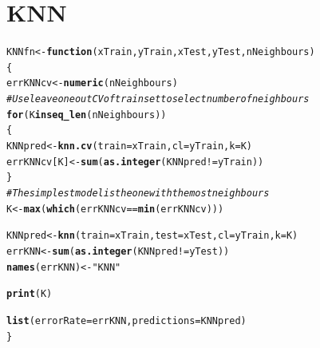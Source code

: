 \documentclass[a4paper,draft=false]{scrreprt}\usepackage[]{graphicx}\usepackage[]{color}
\makeatletter
\newcommand{\hlstr}[1]{\textcolor[rgb]{0.192,0.494,0.8}{#1}}%
\newcommand{\hlcom}[1]{\textcolor[rgb]{0.678,0.584,0.686}{\textit{#1}}}%
\newcommand{\hlopt}[1]{\textcolor[rgb]{0,0,0}{#1}}%
\newcommand{\hlstd}[1]{\textcolor[rgb]{0.345,0.345,0.345}{#1}}%
\newcommand{\hlkwa}[1]{\textcolor[rgb]{0.161,0.373,0.58}{\textbf{#1}}}%
\newcommand{\hlkwb}[1]{\textcolor[rgb]{0.69,0.353,0.396}{#1}}%
\newcommand{\hlkwc}[1]{\textcolor[rgb]{0.333,0.667,0.333}{#1}}%
\newcommand{\hlkwd}[1]{\textcolor[rgb]{0.737,0.353,0.396}{\textbf{#1}}}%
\newenvironment{kframe}{%
 \def\at@end@of@kframe{}%
 \ifinner\ifhmode%
  \def\at@end@of@kframe{\end{minipage}}%
  \begin{minipage}{\columnwidth}%
 \fi\fi%
 \def\FrameCommand##1{\hskip\@totalleftmargin \hskip-\fboxsep
 \colorbox{shadecolor}{##1}\hskip-\fboxsep
     \hskip-\linewidth \hskip-\@totalleftmargin \hskip\columnwidth}%
 \MakeFramed {\advance\hsize-\width
   \@totalleftmargin\z@ \linewidth\hsize
   \@setminipage}}%
 {\par\unskip\endMakeFramed%
 \at@end@of@kframe}
\newenvironment{knitrout}{}{} %
\makeatother
\begin{document}
\section{KNN} %
\begin{knitrout}
\color{fgcolor}\begin{kframe}
\begin{alltt}
\hlstd{KNNfn} \hlkwb{<-} \hlkwa{function}\hlstd{(}\hlkwc{xTrain}\hlstd{,} \hlkwc{yTrain}\hlstd{,} \hlkwc{xTest}\hlstd{,} \hlkwc{yTest}\hlstd{,} \hlkwc{nNeighbours}\hlstd{)}
\hlstd{\{}
    \hlstd{errKNNcv} \hlkwb{<-} \hlkwd{numeric}\hlstd{(nNeighbours)}
    \hlcom{# Use leave one out CV of train set to select number of neighbours}
    \hlkwa{for} \hlstd{(K} \hlkwa{in} \hlkwd{seq_len}\hlstd{(nNeighbours))}
    \hlstd{\{}
      \hlstd{KNNpred} \hlkwb{<-} \hlkwd{knn.cv}\hlstd{(}\hlkwc{train} \hlstd{= xTrain,} \hlkwc{cl} \hlstd{= yTrain,} \hlkwc{k} \hlstd{= K)}
      \hlstd{errKNNcv[K]} \hlkwb{<-} \hlkwd{sum}\hlstd{(}\hlkwd{as.integer}\hlstd{(KNNpred} \hlopt{!=} \hlstd{yTrain))}
    \hlstd{\}}
    \hlcom{# The simplest model is the one with the most neighbours}
    \hlstd{K} \hlkwb{<-} \hlkwd{max}\hlstd{(}\hlkwd{which}\hlstd{(errKNNcv} \hlopt{==} \hlkwd{min}\hlstd{(errKNNcv)))}

    \hlstd{KNNpred} \hlkwb{<-} \hlkwd{knn}\hlstd{(}\hlkwc{train} \hlstd{= xTrain,} \hlkwc{test} \hlstd{= xTest,} \hlkwc{cl} \hlstd{= yTrain,} \hlkwc{k} \hlstd{= K)}
    \hlstd{errKNN} \hlkwb{<-} \hlkwd{sum}\hlstd{(}\hlkwd{as.integer}\hlstd{(KNNpred} \hlopt{!=} \hlstd{yTest))}
    \hlkwd{names}\hlstd{(errKNN)} \hlkwb{<-} \hlstr{"KNN"}

    \hlkwd{print}\hlstd{(K)}

    \hlkwd{list}\hlstd{(}\hlkwc{errorRate} \hlstd{= errKNN,} \hlkwc{predictions} \hlstd{= KNNpred)}
\hlstd{\}}
\end{alltt}
\end{kframe}
\end{knitrout}
\end{document}
